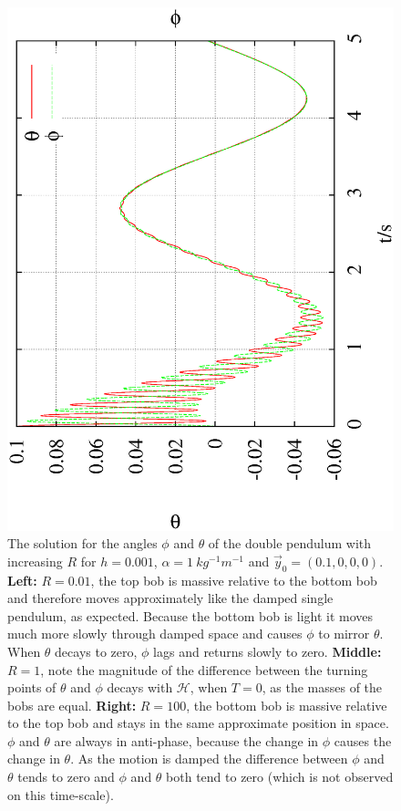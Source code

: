 \documentclass[10pt,a4paper]{article}
\begin{document}
\begin{figure}[h!]
\begin{center}
\includegraphics[scale = 0.2, angle =-90]{0.001_1_100_theta_phi.eps}
\caption{The solution for the angles $\phi$ and $\theta$ of the double pendulum with increasing $R$ for $h=0.001$,  $\alpha = 1\:kg^{-1} m^{-1}$ and $\vec{y}_{0}=(0.1,0,0,0)$. \textbf{Left: }$R=0.01$,  the top bob is massive relative to the bottom bob and therefore moves approximately like the damped single pendulum, as expected. Because the bottom bob is light it moves much more slowly through damped space and causes $\phi$ to mirror $\theta$. When $\theta$ decays to zero, $\phi$ lags and returns slowly to zero.
\textbf{Middle: }$R=1$, note the magnitude of the difference between the turning points of $\theta$ and $\phi$ decays with $\mathcal{H}$, when $T = 0$, as the masses of the bobs are equal. \textbf{Right: }$R=100$, the bottom bob is massive relative to the top bob and stays in the same approximate position in space. $\phi$ and $\theta$ are always in anti-phase, because the change in $\phi$ causes the change in $\theta$. As the motion is damped the difference between $\phi$ and $\theta$ tends to zero and $\phi$ and $\theta$ both tend to zero (which is not observed on this time-scale).}
\label{fig:GeneralMotionDamped}
\end{center}
\end{figure}
\end{document}
